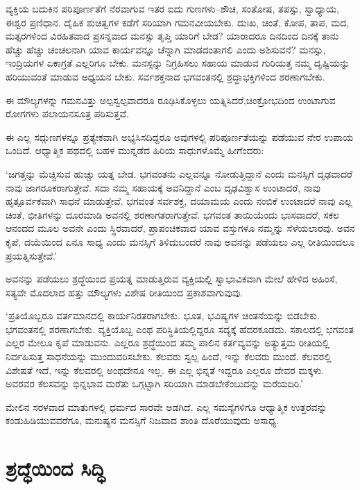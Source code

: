 \newpage

ವ್ಯಕ್ತಿಯ ಬದುಕಿನ ಪರಿಪೂರ್ಣತೆಗೆ ನೆರವಾಗುವ ಇತರ ಐದು ಗುಣಗಳು–ಶೌಚ, ಸಂತೋಷ, ತಪಸ್ಸು, ಸ್ವಾಧ್ಯಾಯ, ಈಶ್ವರ ಪ್ರಣಿಧಾನ. ದೈಹಿಕ ಶುಚಿತ್ವಗಳ ಕಡೆಗೆ ಸರಿಯಾಗಿ ಗಮನವೀಯಬೇಕು. ದುಃಖ, ಚಿಂತೆ, ಕೋಪ, ತಾಪ, ಮದ, ಮತ್ಸರಗಳಿಂದ ವಿರಹಿತವಾದ ಪ್ರಸನ್ನವಾದ ಮನಸ್ಸು ತೃಪ್ತಿ ಯಾರಿಗೆ ಬೇಡ? ಯಾರಾದರೂ ದಿನದಿಂದ ದಿನಕ್ಕೆ ತಾನು ಹೆಚ್ಚು ಹೆಚ್ಚು ಚಂಚಲನಾಗಿ ಯಾವ ಕಾರ್ಯವನ್ನೂ ಚೆನ್ನಾಗಿ ಮಾಡದಂತಾಗಲಿ ಎಂದು ಅಶಿಸುವನೆ? ಮನಸ್ಸು, ಇಂದ್ರಿಯಗಳ ಏಕಾಗ್ರತೆ ಎಲ್ಲರಿಗೂ ಬೇಕು. ಮನಸ್ಸನ್ನು ನಿಗ್ರಹಿಸಲು ಸಹಾಯ ಮಾಡುವ ಗುರಿಯತ್ತ ನಮ್ಮ ದೃಷ್ಟಿಯನ್ನು ಹರಿಯುವಂತೆ ಮಾಡುವ ಅಧ್ಯಯನ ಬೇಕು. ಸರ್ವಶಕ್ತನಾದ ಭಗವಂತನಲ್ಲಿ ಶ್ರದ್ಧಾಭಕ್ತಿಗಳಿಂದ ಶರಣಾಗಬೇಕು.

ಈ ಮೌಲ್ಯಗಳನ್ನು ಗಮನವಿತ್ತು ಅಲ್ಪಸ್ವಲ್ಪವಾದರೂ ರೂಢಿಸಿಕೊಳ್ಳಲು ಯತ್ನಿಸಿದರೆ,\break ಚಿಂಕ್ರೋಭದಿಂದ ಉಂಟಾಗುವ ರೋಗಗಳು ಪಲಾಯನಸೂತ್ರ ಪಠಿಸುತ್ತವೆ.

ಈ ಎಲ್ಲ ಸದ್ಗುಣಗಳನ್ನೂ ಪ್ರತ್ಯೇಕವಾಗಿ ಅಭ್ಯಸಿಸದಿದ್ದರೂ ಅವುಗಳಲ್ಲಿ ಪರಿಪೂರ್ಣತೆಯನ್ನು ಪಡೆಯುವ ನೇರ ಉಪಾಯ ಒಂದಿದೆ. ಆಧ್ಯಾತ್ಮಿಕ ಪಥದಲ್ಲಿ ಬಹಳ ಮುನ್ನಡೆದ ಹಿರಿಯ ಸಾಧುಗಳೊಮ್ಮೆ ಹೀಗೆಂದರು:

‘ಜಗತ್ತನ್ನು ಮೆಚ್ಚಿಸುವ ಹುಚ್ಚು ಯತ್ನ ಬೇಡ. ಭಗವಂತನು ಎಲ್ಲವನ್ನೂ ನೋಡುತ್ತಿದ್ದಾನೆ ಎಂದು ಮನಸ್ಸಿಗೆ ದೃಢವಾದರೆ ನಾವು ಜಾಗರೂಕರಾಗುತ್ತೇವೆ. ಸದಾ ನಮ್ಮ ಸಹಾಯಕ್ಕೆ ಅವನಿದ್ದಾನೆ ಎಂಬ ದೃಢವಿಶ್ವಾಸ ಉಂಟಾದರೆ, ನಾವು ಹೃತ್ಪೂರ್ವಕವಾಗಿ ಸಾಧನೆ ಮಾಡುತ್ತೇವೆ. ಭಗವಂತ ಸರ್ವಶಕ್ತ, ದಯಾಮಯ ಎಂದು ನಂಬಿಕೆ ಉಂಟಾದರೆ ನಾವು ಎಲ್ಲ ಚಿಂತೆ, ಭೀತಿಗಳನ್ನು ದೂರಮಾಡಿ ಅವನಲ್ಲಿ ಶರಣಾಗತರಾಗುತ್ತೇವೆ. ಭಗವಂತ ತಾಯಿಯೆಂದು ಭಾಸವಾದರೆ, ಸಕಲ ಆನಂದದ ಮೂಲ ಅವನೇ ಎಂದು ಸ್ಥಿರವಾದರೆ, ಪ್ರಾಪಂಚಿಕವಾದ ಯಾವ ವಸ್ತುಗಳೂ ನಮ್ಮನ್ನು ಸೆಳೆಯಲಾರವು. ಅವನ ಕೃಪೆ, ದಯೆಯಿಂದ ಏನೂ ಸಾಧ್ಯ ಎಂದು ಮನಸ್ಸಿಗೆ ತಿಳಿದುಬಂದರೆ ನಾವು ಅವನನ್ನು ಪಡೆಯಲು ಎಲ್ಲ ರೀತಿಯಿಂದಲೂ ಪ್ರಯತ್ನಿಸುತ್ತೇವೆ.’

ಅವನನ್ನು ಪಡೆಯಲು ಶ್ರದ್ಧೆಯಿಂದ ಪ್ರಯತ್ನ ಮಾಡುತ್ತಿರುವ ವ್ಯಕ್ತಿಯಲ್ಲಿ ಸ್ವಾಭಾವಿಕವಾಗಿ ಮೇಲೆ ಹೇಳಿದ ಅಹಿಂಸೆ, ಸತ್ಯವೇ ಮೊದಲಾದ ಹತ್ತು ಮೌಲ್ಯಗಳು ವಿಶೇಷ ರೀತಿಯಿಂದ ಪ್ರಕಾಶವಾಗುವುವು.

‘ಪ್ರತಿಯೊಬ್ಬರೂ ವರ್ತಮಾನದಲ್ಲಿ ಕಾರ್ಯನಿರತರಾಗಬೇಕು. ಭೂತ, ಭವಿಷ್ಯಗಳ ಚಿಂತನೆಯನ್ನು ಬಿಡಬೇಕು. ಭಗವಂತನಲ್ಲಿ ಶರಣಾಗಬೇಕು. ವ್ಯಕ್ತಿಯೊಬ್ಬ ಎಂಥ ಪರಿಸ್ಥಿತಿಯಲ್ಲಿದ್ದರೂ ಸದ್ಯಕ್ಕೆ ಹೆದರಕೂಡದು. ಸಕಾಲದಲ್ಲಿ ಭಗವಂತ ಎಲ್ಲರ ಮೇಲೂ ಕೃಪೆ ಮಾಡುವನು. ಎಲ್ಲರೂ ಶ್ರದ್ಧೆಯಿಂದ ತಮ್ಮ ಪಾಲಿನ ಕರ್ತವ್ಯವನ್ನು ಅತ್ಯುತ್ತಮ ರೀತಿಯಲ್ಲಿ ನಿರ್ವಹಿಸುತ್ತ ಸಾಧನೆಯನ್ನು ಮುಂದುವರಿಸಬೇಕು. ಕೆಲವರು ಸ್ವಲ್ಪ ಹಿಂದೆ, ಇನ್ನು ಕೆಲವರು ಮುಂದೆ. ಕೆಲವರಲ್ಲಿ ವಿಶೇಷತೆ ಇದೆ, ಇನ್ನು ಕೆಲವರಲ್ಲಿ ಅಂಥದೇನೂ ಇಲ್ಲ. ಈ ಎಲ್ಲ ಭಿನ್ನತೆ ಇದ್ದರೂ ಎಲ್ಲರೂ ದೇವರ ಮಕ್ಕಳು. ಅವರವರ ಕೆಲಸವನ್ನು ಭಿನ್ನಭಾವ ಮರೆತು ಒಗ್ಗಟ್ಟಾಗಿ ಸರಿಯಾಗಿ ಮಾಡಬೇಕೆಂಬುದನ್ನು ಮರೆಯದಿರಿ.’

ಮೇಲಿನ ಸರಳವಾದ ಮಾತುಗಳಲ್ಲಿ ಧರ್ಮದ ಸಾರವೇ ಅಡಗಿದೆ. ಎಲ್ಲ ಸಮಸ್ಯೆಗಳಿಗೂ ಆಧ್ಯಾತ್ಮಿಕ ಉತ್ತರವನ್ನು ಕಂಡುಹಿಡಿಯುವವರೆಗೂ, ಮನುಷ್ಯನ ಮನಸ್ಸಿಗೆ ನಿಜವಾದ ಶಾಂತಿ ದೊರೆಯುವುದು ಅಸಾಧ್ಯ.


\section*{ಶ್ರದ್ಧೆಯಿಂದ ಸಿದ್ಧಿ}

